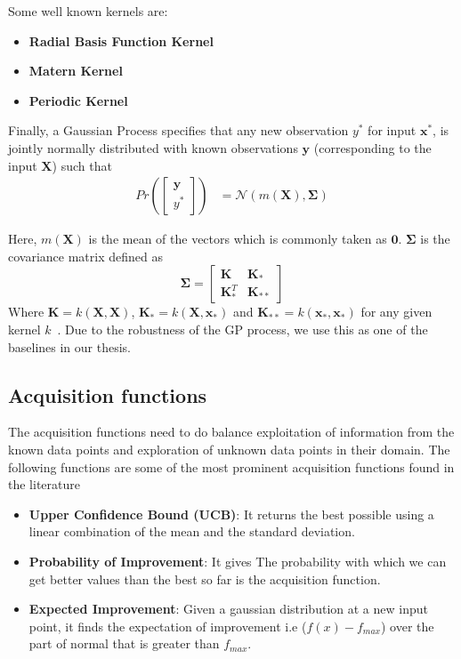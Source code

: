 \documentclass[11pt]{report}
\begin{document}
Some well known kernels are:
\begin{itemize}
\item \textbf{Radial Basis Function Kernel}
\item \textbf{Matern Kernel}
\item \textbf{Periodic Kernel}
\end{itemize}

Finally,  a Gaussian Process specifies that any new observation $y^*$ for input $\textbf{x}^*$,  is jointly normally distributed with known observations $\textbf{y}$ (corresponding to the input $\textbf{X}$) such that
\begin{align}
    Pr\left( \begin{bmatrix}
           \textbf{y} \\
           y^*
         \end{bmatrix}
         \right)
         &=  \mathcal{N}\left(m(\textbf{X}), \mathbf{\Sigma}\right)
\end{align}

Here, $m(\textbf{X})$ is the mean of the vectors which is commonly taken as $\textbf{0}$.
$\mathbf{\Sigma}$ is the covariance matrix defined as
$$
\mathbf{\Sigma} = \begin{bmatrix}
           \textbf{K} & \textbf{K}_* \\
           \textbf{K}_*^T & \textbf{K}_{**}
         \end{bmatrix}
$$
  Where $\textbf{K} = k(\textbf{X}, \textbf{X})$,  $\textbf{K}_*  =  k(\textbf{X}, \textbf{x}_*)$ and $\textbf{K}_{**} = k(\textbf{x}_*,  \textbf{x}_*)$ for any given kernel $k$~\cite{GPTutorial}.
  Due to the robustness of the GP process, we use this as one of the baselines in our thesis.

\subsection{Acquisition functions}
The acquisition functions need to do balance exploitation of information from the known data points and exploration of unknown data points in their domain.
The following functions are some of the most prominent acquisition functions found in the literature~\cite{GPTutorial}
\begin{itemize}
\item \textbf{Upper Confidence Bound (UCB)}: It returns the best possible using a linear combination of the mean and the standard deviation.
\item \textbf{Probability of Improvement}: It gives The probability with which we can get better values than the best so far is the acquisition function.
\item \textbf{Expected Improvement}: Given a gaussian distribution at a new input point, it finds the expectation of improvement i.e ($f(x) - f_{max}$) over the part of normal that is greater than $f_{max}$.
\end{itemize}
\end{document}

